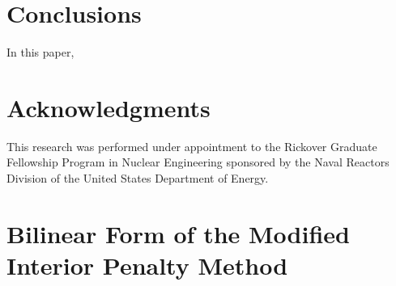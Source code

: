 \documentclass[preprint,10pt]{elsarticle}
\begin{document}

\section{Conclusions} \label{sec::conclusions}

In this paper,

\section*{Acknowledgments} 
This research was performed under appointment to the Rickover Graduate Fellowship Program in Nuclear Engineering sponsored by the Naval Reactors Division of the United States Department of Energy.




\appendix
\section{Bilinear Form of the Modified Interior Penalty Method}  \label{app::mip}
\end{document}
